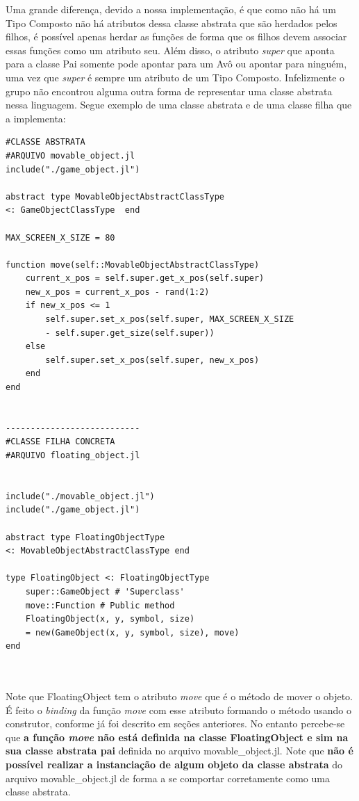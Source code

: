 \documentclass[rel_mlp]{iiufrgs}
\begin{document}
Uma grande diferença, devido a nossa implementação, é que como não há um Tipo Composto não há atributos dessa classe abstrata que são herdados pelos filhos, é possível apenas herdar as funções de forma que os filhos devem associar essas funções como um atributo seu. Além disso, o atributo \textit{super} que aponta para a classe Pai somente pode apontar para um Avô ou apontar para ninguém, uma vez que \textit{super} é sempre um atributo de um Tipo Composto. Infelizmente o grupo não encontrou alguma outra forma de representar uma classe abstrata nessa linguagem. Segue exemplo de uma classe abstrata e de uma classe filha que a implementa:
\begin{lstlisting}[frame=single]
#CLASSE ABSTRATA
#ARQUIVO movable_object.jl
include("./game_object.jl")

abstract type MovableObjectAbstractClassType 
<: GameObjectClassType  end  

MAX_SCREEN_X_SIZE = 80

function move(self::MovableObjectAbstractClassType)
    current_x_pos = self.super.get_x_pos(self.super)
    new_x_pos = current_x_pos - rand(1:2)
    if new_x_pos <= 1
        self.super.set_x_pos(self.super, MAX_SCREEN_X_SIZE 
        - self.super.get_size(self.super))
    else
        self.super.set_x_pos(self.super, new_x_pos)
    end
end


---------------------------
#CLASSE FILHA CONCRETA
#ARQUIVO floating_object.jl


include("./movable_object.jl")
include("./game_object.jl")

abstract type FloatingObjectType  
<: MovableObjectAbstractClassType end  

type FloatingObject <: FloatingObjectType 
	super::GameObject # 'Superclass'
    move::Function # Public method
	FloatingObject(x, y, symbol, size)
	= new(GameObject(x, y, symbol, size), move)
end



\end{lstlisting}

Note que FloatingObject tem o atributo \textit{move} que é o método de mover o objeto. É feito o \textit{binding} da função \textit{move} com esse atributo formando o método usando o construtor, conforme já foi descrito em seções anteriores. No entanto percebe-se que \textbf{a função \textit{move} não está definida na classe FloatingObject e sim na sua classe abstrata pai} definida no arquivo movable\_object.jl. Note que \textbf{não é possível realizar a instanciação de algum objeto da classe abstrata} do arquivo movable\_object.jl de forma a se comportar corretamente como uma classe abstrata.
\end{document}
